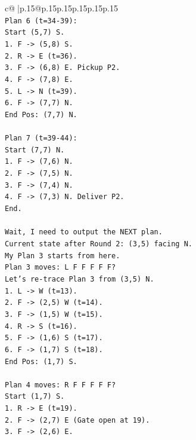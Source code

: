 \documentclass{article}
\begin{document}
{\begin{supertabular}{c@{$\;$}|p{.15\linewidth}@{}p{.15\linewidth}p{.15\linewidth}p{.15\linewidth}p{.15\linewidth}p{.15\linewidth}}
{{{\\ 
\texttt{Plan 6 (t=34{-}39):} \\
\texttt{Start (5,7) S.} \\
\texttt{1. F {-}> (5,8) S.} \\
\texttt{2. R {-}> E (t=36).} \\
\texttt{3. F {-}> (6,8) E. Pickup P2.} \\
\texttt{4. F {-}> (7,8) E.} \\
\texttt{5. L {-}> N (t=39).} \\
\texttt{6. F {-}> (7,7) N.} \\
\texttt{End Pos: (7,7) N.} \\
\\ 
\texttt{Plan 7 (t=39{-}44):} \\
\texttt{Start (7,7) N.} \\
\texttt{1. F {-}> (7,6) N.} \\
\texttt{2. F {-}> (7,5) N.} \\
\texttt{3. F {-}> (7,4) N.} \\
\texttt{4. F {-}> (7,3) N. Deliver P2.} \\
\texttt{End.} \\
\\ 
\texttt{Wait, I need to output the NEXT plan.} \\
\texttt{Current state after Round 2: (3,5) facing N.} \\
\texttt{My Plan 3 starts from here.} \\
\texttt{Plan 3 moves: L F F F F F?} \\
\texttt{Let's re{-}trace Plan 3 from (3,5) N.} \\
\texttt{1. L {-}> W (t=13).} \\
\texttt{2. F {-}> (2,5) W (t=14).} \\
\texttt{3. F {-}> (1,5) W (t=15).} \\
\texttt{4. R {-}> S (t=16).} \\
\texttt{5. F {-}> (1,6) S (t=17).} \\
\texttt{6. F {-}> (1,7) S (t=18).} \\
\texttt{End Pos: (1,7) S.} \\
\\ 
\texttt{Plan 4 moves: R F F F F F?} \\
\texttt{Start (1,7) S.} \\
\texttt{1. R {-}> E (t=19).} \\
\texttt{2. F {-}> (2,7) E (Gate open at 19).} \\
\texttt{3. F {-}> (2,6) E.} \\
}}}
\end{supertabular}}
\end{document}
